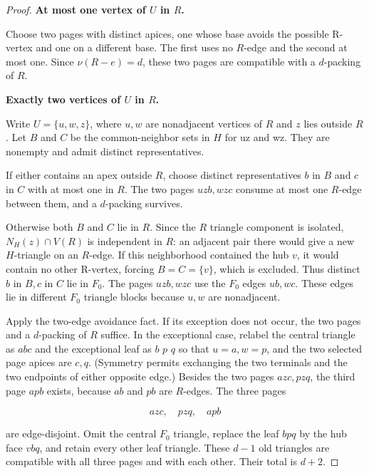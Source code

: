 \documentclass[11pt]{article}
\theoremstyle{definition}\newtheorem{definition}[theorem]{Definition}
\theoremstyle{remark}\newtheorem{remark}[theorem]{Remark}
\begin{document}
\begin{proof}
\par\medskip\noindent\textbf{At most one vertex of \(U\) in \(R\).}\label{at-most-one-vertex-of-u-in-r}

Choose two pages with distinct apices, one whose base avoids the possible R-vertex and one on a different base. The first uses no \(R\)-edge and the second at most one. Since \(\nu(R-e)=d\), these two pages are compatible with a \(d\)-packing of \(R\).

\par\medskip\noindent\textbf{Exactly two vertices of \(U\) in \(R\).}\label{exactly-two-vertices-of-u-in-r}

Write \(U=\{u,w,z\}\), where \(u,w\) are nonadjacent vertices of \(R\) and \(z\) lies outside \(R\). Let \(B\) and \(C\) be the common-neighbor sets in \(H\) for uz and wz. They are nonempty and admit distinct representatives.

If either contains an apex outside \(R\), choose distinct representatives \(b\) in \(B\) and \(c\) in \(C\) with at most one in \(R\). The two pages \(uzb,wzc\) consume at most one \(R\)-edge between them, and a \(d\)-packing survives.

Otherwise both \(B\) and \(C\) lie in \(R\). Since the \(R\) triangle component is isolated, \(N_H(z) \cap V(R)\) is independent in \(R\): an adjacent pair there would give a new \(H\)-triangle on an \(R\)-edge. If this neighborhood contained the hub \(v\), it would contain no other R-vertex, forcing \(B=C=\{v\}\), which is excluded. Thus distinct \(b\) in \(B,c\) in \(C\) lie in \(F_0\). The pages \(uzb,wzc\) use the \(F_0\) edges \(ub,wc\). These edges lie in different \(F_0\) triangle blocks because \(u,w\) are nonadjacent.

Apply the two-edge avoidance fact. If its exception does not occur, the two pages and a \(d\)-packing of \(R\) suffice. In the exceptional case, relabel the central triangle as \(abc\) and the exceptional leaf as \(b\) \(p\) \(q\) so that \(u=a,w=p\), and the two selected page apices are \(c,q\). (Symmetry permits exchanging the two terminals and the two endpoints of either opposite edge.) Besides the two pages \(azc,pzq\), the third page \(apb\) exists, because \(ab\) and \(pb\) are \(R\)-edges. The three pages

\begin{equation}
azc,\quad pzq,\quad apb
\end{equation}

are edge-disjoint. Omit the central \(F_0\) triangle, replace the leaf \(bpq\) by the hub face \(vbq\), and retain every other leaf triangle. These \(d-1\) old triangles are compatible with all three pages and with each other. Their total is \(d+2\).


\end{proof}
\end{document}
